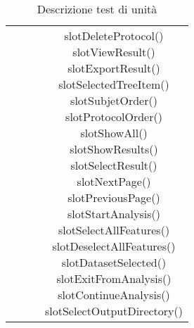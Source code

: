 \begin{center}
\begin{longtable}{|c|c|c|c|}
& & &\parbox[t]{\dimTipo} {slotDeleteProtocol() \\ slotViewResult() \\ slotExportResult() \\ slotSelectedTreeItem() \\ slotSubjetOrder() \\ slotProtocolOrder() \\ slotShowAll() \\ slotShowResults() \\ slotSelectResult() \\ slotNextPage() \\ slotPreviousPage() \\ slotStartAnalysis() \\ slotSelectAllFeatures() \\ slotDeselectAllFeatures() \\ slotDatasetSelected() \\ slotExitFromAnalysis() \\ slotContinueAnalysis() \\ slotSelectOutputDirectory() \\ } \\
\hline
\caption{Descrizione test di unità }
\end{longtable}
\end{center}
